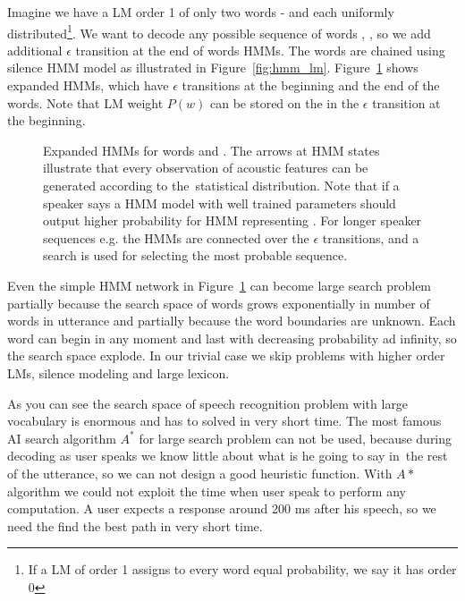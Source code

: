 {Imagine we have a \ac{LM} order 1 of only two words -  and  each uniformly distributed\footnote{If a \ac{LM} of order 1 assigns to every word equal probability, we say it has order 0}.
We want to decode any possible sequence of words , , so we add additional $\epsilon$ transition at the end of words \acp{HMM}. 
The words are chained using silence \ac{HMM} model as illustrated in Figure~\ref{fig:hmm_lm}.
Figure~\ref{fig:hmm_alt} shows expanded \acp{HMM}, which have $\epsilon$ transitions
at the beginning and the end of the words. 
Note that \ac{LM} weight $P(w)$ can be stored on the in the $\epsilon$ transition at the beginning.
\begin{figure}[!htp]
    \begin{center}
        
        \caption{Expanded \acp{HMM} for words  and . 
        The arrows at \ac{HMM} states illustrate that every observation of acoustic features 
        can be generated according to the~statistical distribution. 
        Note that if a speaker says  a \ac{HMM} model with well trained parameters should output higher probability
        for \ac{HMM} representing . For longer speaker sequences e.g.  the \acp{HMM} are connected over the 
$\epsilon$ transitions, and a search is used for selecting the most probable sequence.}
        \label{fig:hmm_alt} 
    \end{center}
\end{figure}

Even the simple \ac{HMM} network in Figure~\ref{fig:hmm_alt} can become
large search problem partially because the search space of words grows
exponentially in number of words in utterance and partially
because the word boundaries are unknown. 
Each word can begin in any moment and last with decreasing probability ad infinity,
so the search space explode.
In our trivial case we skip problems with higher order \acp{LM}, silence modeling
and large lexicon.

As you can see the search space of speech recognition problem with 
large vocabulary is enormous and has to solved in very short time.
The most famous \ac{AI} search algorithm $A^*$ for large search problem can not be used,
because during decoding as user speaks we know little about what is he going to say in~the 
rest of the utterance, so we can not design a good heuristic function.
With $A*$ algorithm we could not exploit the time when user speak
to perform any computation. A user expects a response around 200 ms after his speech, 
so we need the find the best path in very short time.

}
